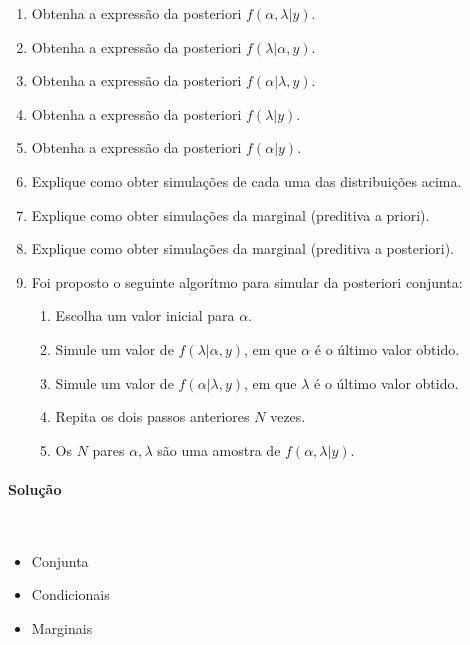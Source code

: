 \documentclass[11pt,a4]{article}\usepackage[]{graphicx}\usepackage[]{xcolor}
\begin{document}
\begin{enumerate}
  \begin{enumerate}
  \item Obtenha a expressão da posteriori $f(\alpha, \lambda|y)$.
  \item Obtenha a expressão da posteriori $f(\lambda|\alpha, y)$.
  \item Obtenha a expressão da posteriori $f(\alpha|\lambda, y)$.
  \item Obtenha a expressão da posteriori $f(\lambda|y)$.
  \item Obtenha a expressão da posteriori $f(\alpha|y)$.
  \item Explique como obter simulações de cada uma das distribuições acima. 
  \item Explique como obter simulações da marginal (preditiva a priori). 
  \item Explique como obter simulações da marginal (preditiva a posteriori). 
  \item Foi proposto o seguinte algorítmo para simular da posteriori conjunta:
    \begin{enumerate}
    \item Escolha um valor inicial para $\alpha$.
    \item Simule um valor de $f(\lambda|\alpha, y)$, em que $\alpha$ é o último valor obtido.
    \item Simule um valor de $f(\alpha|\lambda, y)$, em que $\lambda$ é o último valor obtido.
    \item Repita os dois passos anteriores $N$ vezes.     
    \item Os $N$ pares $\alpha, \lambda$ são uma amostra de $f(\alpha, \lambda|y)$.
    \end{enumerate}
  \end{enumerate}

\begin{solucao}
\paragraph{\bf Solução} \mbox{} \\ 
\begin{itemize}
\item Conjunta
\item Condicionais
\item Marginais
\end{itemize}
\end{solucao} 






\end{enumerate}
\end{document}
